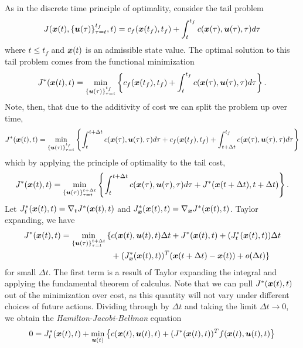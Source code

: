 As in the discrete time principle of optimality, consider the tail problem
\begin{equation}
    J(\bm{x}(t),\{\bm{u}(\tau)\}_{\tau=t}^{t_f},t) = c_f(\bm{x}(t_f),t_f) + \int_t^{t_f} c(\bm{x}(\tau),\bm{u}(\tau),\tau) d\tau
\end{equation}
where $t\leq t_f$ and $\bm{x}(t)$ is an admissible state value. The optimal solution to this tail problem comes from the functional minimization
\begin{equation}
    J^*(\bm{x}(t),t) = \min_{\{\bm{u}(\tau)\}_{\tau=t}^{t_f}} \left\{ c_f(\bm{x}(t_f),t_f) + \int_t^{t_f} c(\bm{x}(\tau),\bm{u}(\tau),\tau) d\tau\right\}.
\end{equation}
Note, then, that due to the additivity of cost we can split the problem up over time,
\begin{equation}
    J^*(\bm{x}(t),t) = \min_{\{\bm{u}(\tau)\}_{\tau=t}^{t_f}} \left\{ \int_t^{t+\Delta t} c(\bm{x}(\tau),\bm{u}(\tau),\tau) d\tau + c_f(\bm{x}(t_f),t_f) + \int_{t+\Delta t}^{t_f} c(\bm{x}(\tau),\bm{u}(\tau),\tau) d\tau\right\}
\end{equation}    
which by applying the principle of optimality to the tail cost,
\begin{equation}
     J^*(\bm{x}(t),t) = \min_{\{\bm{u}(\tau)\}_{\tau=t}^{t + \Delta t}} \left\{ \int_t^{t+\Delta t} c(\bm{x}(\tau),\bm{u}(\tau),\tau) d\tau + J^*(\bm{x}(t + \Delta t), t + \Delta t)\right\}.
\end{equation}
Let $J^*_t(\bm{x}(t),t) = \nabla_t J^* (\bm{x}(t),t)$ and $J^*_{\bm{x}}(\bm{x}(t),t) = \nabla_{\bm{x}} J^* (\bm{x}(t),t)$. Taylor expanding, we have 
\begin{align}
\J^*(\st(t),t) = \min_{\{\ac(\tau)\}_{\tau=t}^{t + \Delta t}} \huge{\{} &\cost(\st(t),\ac(t),t) \Delta t + \J^*(\st(t),t) + (\J_t^*(\st(t),t)) \Delta t \\
&+ (\J_{\st}^*(\st(t),t))^T (\st(t+\Delta t) - \st(t))  + o(\Delta t) \huge{\}} \nonumber
\end{align}
for small $\Delta t$. The first term is a result of Taylor expanding the integral and applying the fundamental theorem of calculus. Note that we can pull $J^*(\bm{x}(t),t)$ out of the minimization over cost, as this quantity will not vary under different choices of future actions. Dividing through by $\Delta t$ and taking the limit $\Delta t \to 0$, we obtain the \textit{Hamilton-Jacobi-Bellman} equation
\begin{equation}
    0 = J^*_t(\bm{x}(t),t) + \min_{\bm{u}(t)} \left\{ c(\bm{x}(t),\bm{u}(t),t) + (J^*(\bm{x}(t),t))^T f(\bm{x}(t),\bm{u}(t),t) \right\}
\end{equation}

